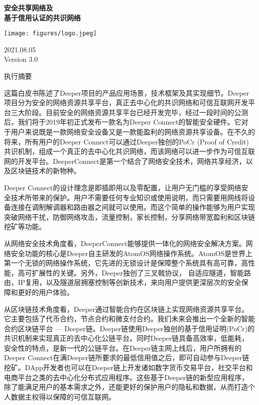 \documentclass[a4paper]{article}
\begin{document}
\begin{titlepage}
	\begin{center}
		\vspace*{1cm}

		\Huge
		\textbf{安全共享网络及\\基于信用认证的共识网络}

		\vspace{2cm}

		\texttt{[image: figures/logo.jpeg]}

		\normalsize
		2021.08.05 \\ Version 3.0
	\end{center}
\end{titlepage}

\centerline{执行摘要}
这篇白皮书陈述了Deeper项目的产品应用场景，技术框架及其实现细节。Deeper项目分为安全的网络资源共享平台，真正去中心化的共识网络和可信互联网开发平台三大阶段。目前安全的网络资源共享平台已经开发完毕，经过一段时间的公测后，我们将于2019年初正式发布一款名为Deeper Connect的智能安全硬件。它对于用户来说既是一款网络安全设备又是一款能盈利的网络资源共享设备。在不久的将来，所有用户的Deeper Connect可以通过Deeper独创的PoCr (Proof of Credit)共识机制，组成一个真正的去中心化共识网络，而该网络可以进一步作为可信互联网的开发平台。DeeperConnect是第一个结合了网络安全技术，网络共享经济，以及区块链技术的新物种。

Deeper Connect的设计理念是即插即用以及零配置，让用户无门槛的享受网络安全技术所带来的保护。用户不需要任何专业知识或使用说明，而只需要用网线将设备连接在调制解调器和路由器之间就可以使用。而这个简单的操作能够为用户实现突破网络干扰，防御网络攻击，流量控制，家长控制，分享网络带宽盈利和区块链挖矿等功能。

从网络安全技术角度看，DeeperConnect能够提供一体化的网络安全解决方案。网络安全功能的核心是Deeper自主研发的AtomOS网络操作系统。AtomOS是世界上第一个无锁的网络操作系统，它先进的无锁设计是保障整个系统具有高可靠，高性能，高可扩展性的关键。另外，Deeper独创了三叉戟协议， 自适应隧道，智能路由，IP复用，以及隧道层拥塞控制等创新技术，来向用户提供更深层次的安全保障和更好的用户体验。

从区块链技术角度看，Deeper通过智能合约在区块链上实现网络资源共享平台。它主要包括了代币合约，节点合约和微支付合约。我们未来会推出一个全新的智能合约区块链平台 --- Deeper链。Deeper链使用Deeper独创的基于信用证明(PoCr)的共识机制来实现真正的去中心化公链平台。同时Deeper链具备高效率，低能耗，安全性的特点，是新一代的公链平台。在Deeper链主网上线后，用户所拥有的Deeper Connect在满Deeper链所要求的最低信用值之后，即可自动参与Deeper链挖矿。DApp开发者也可以在Deeper链上开发诸如数字货币交易平台，社交平台和电商平台之类的去中心化分布式应用程序。这些基于Deeper链的新型应用程序，除了能满足用户的基本需求之外，还能更好的保护用户的隐私和数据，从而打造个人数据主权得以保障的可信互联网。
\end{document}
